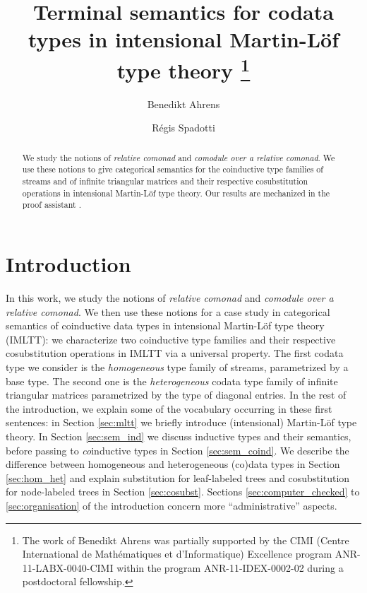 \documentclass[a4paper,USenglish]{lipics}
\title{Terminal semantics for codata types in intensional Martin-L\"of type theory%
\footnote{The work of Benedikt Ahrens was partially supported by the CIMI (Centre International de Mathématiques et d'Informatique) Excellence program ANR-11-LABX-0040-CIMI within the program ANR-11-IDEX-0002-02 during a postdoctoral fellowship.}
}
\author{Benedikt Ahrens}
\author{R\'egis Spadotti}
\affil{
Institut de Recherche en Informatique de Toulouse\\
Universit\'e Paul Sabatier, 
Toulouse}
\begin{document}
\maketitle


\begin{abstract}
 We study the notions of \emph{relative comonad} and \emph{comodule over a relative comonad}.
 We use these notions to give categorical semantics for the coinductive type families of streams and
 of infinite triangular matrices and their respective cosubstitution operations in intensional Martin-L\"of type theory.
 Our results are mechanized in the proof assistant \coq.
\end{abstract}




\section{Introduction}
 
 In this work, we study the notions of \emph{relative comonad} and \emph{comodule over a relative comonad}.
 We then use these notions for a case study in categorical semantics of coinductive data types in intensional Martin-Löf type theory (IMLTT): 
 we characterize two coinductive type families and their respective cosubstitution operations 
 in IMLTT via a universal property.
 The first codata type we consider is the \emph{homogeneous} type family of streams, parametrized by a base type.
 The second one is the \emph{heterogeneous} codata type family of infinite triangular matrices parametrized by the type of diagonal entries.
  In the rest of the introduction, we explain some of the vocabulary occurring in these first sentences:
  in Section \ref{sec:mltt} we briefly introduce (intensional) Martin-Löf type theory. In Section \ref{sec:sem_ind} we discuss inductive types and their semantics,
  before passing to \emph{co}inductive types in Section \ref{sec:sem_coind}.
  We describe
  the difference between homogeneous and heterogeneous (co)data types in Section \ref{sec:hom_het} and explain substitution for leaf-labeled trees and cosubstitution for node-labeled trees in Section \ref{sec:cosubst}.
  Sections \ref{sec:computer_checked} to \ref{sec:organisation} of the introduction concern more \enquote{administrative} aspects.
  
  
\end{document}
